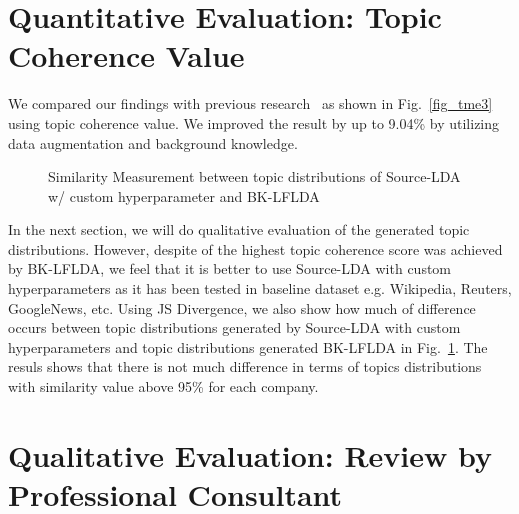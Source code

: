 \documentclass[senior]{IPSstyle}
\begin{document}
\section{Quantitative Evaluation: Topic Coherence Value}

We compared our findings with previous research~\cite{goto2} as shown in Fig.~\ref{fig_tme3} using topic coherence value. We improved the result by up to 9.04\% by utilizing data augmentation and background knowledge.

\begin{figure}[b]
	\centering
	\caption{Similarity Measurement between topic distributions of Source-LDA w/ custom hyperparameter and BK-LFLDA}
\label{fig_tme5}
\end{figure}

In the next section, we will do qualitative evaluation of the generated topic distributions. However, despite of the highest topic coherence score was achieved by BK-LFLDA, we feel that it is better to use Source-LDA with custom hyperparameters as it has been tested in baseline dataset e.g. Wikipedia, Reuters, GoogleNews, etc. Using JS Divergence, we also show how much of difference occurs between topic distributions generated by Source-LDA with custom hyperparameters and topic distributions generated BK-LFLDA in Fig.~\ref{fig_tme5}. The resuls shows that there is not much difference in terms of topics distributions with similarity value above 95\% for each company.

\section{Qualitative Evaluation: Review by Professional Consultant}
\end{document}
